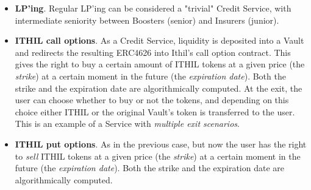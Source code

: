 \documentclass[a4paper,10 pt]{article}
\theoremstyle{definition}
\begin{document}
\begin{itemize}
\item {\bf LP'ing}. Regular LP'ing can be considered a "trivial" Credit Service, with intermediate seniority between Boosters (senior) and Insurers (junior).

\item {\bf ITHIL call options}. As a Credit Service, liquidity is deposited into a Vault and redirects the resulting ERC4626 into Ithil's call option contract. This gives the right to buy a certain amount of ITHIL tokens at a given price (the {\it strike}) at a certain moment in the future (the {\it expiration date}). Both the strike and the expiration date are algorithmically computed. At the exit, the user can choose whether to buy or not the tokens, and depending on this choice either ITHIL or the original Vault's token is transferred to the user. This is an example of a Service with {\it multiple exit scenarios}.

\item {\bf ITHIL put options}. As in the previous case, but now the user has the right to {\it sell} ITHIL tokens at a given price (the {\it strike}) at a certain moment in the future (the {\it expiration date}). Both the strike and the expiration date are algorithmically computed.
\end{itemize}
\end{document}
